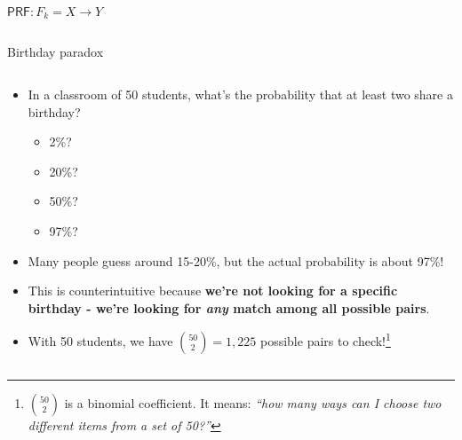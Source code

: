 \documentclass[aspectratio=169, lualatex, handout]{beamer}
\begin{document}
\begin{frame}{$\mathsf{PRF}: F_{k}= X \rightarrow Y$}
\begin{columns}[c]
\begin{column}{0.8\textwidth}
		\end{column}
	\end{columns}
\end{frame}

\begin{frame}{Birthday paradox}
	\begin{columns}[c]
		\begin{column}{1\textwidth}
			\begin{itemize}
				\item In a classroom of 50 students, what's the probability that at least two share a birthday?
				      \begin{itemize}
					      \item 2\%?
					      \item 20\%?
					      \item 50\%?
					      \item 97\%?
				      \end{itemize}
				\item Many people guess around 15-20\%, but the actual probability is about 97\%!
				\item This is counterintuitive because \textbf{we're not looking for a specific birthday - we're looking for \textit{any} match among all possible pairs}.
				\item With 50 students, we have $\binom{50}{2} = 1,225$ possible pairs to check!\footnote{$\binom{50}{2}$ is a binomial coefficient. It means: \textit{``how many ways can I choose two different items from a set of 50?''}}
			\end{itemize}
		\end{column}
	\end{columns}
\end{frame}
\end{document}
